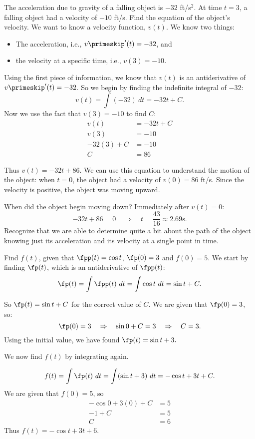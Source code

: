 \begin{example}\label{ex_anti4}
The acceleration due to gravity of a falling object is $-32$ ft/s$^2$. At time $t=3$, a falling object had a velocity of $-10$ ft/s. Find the equation of the object's velocity.
\solution
We want to know a velocity function, $v(t)$. We know two things:
	\begin{itemize}
		\item		The acceleration, i.e., $v\primeskip'(t)= -32$, and
		\item		the velocity at a specific time, i.e., $v(3) = -10$.
	\end{itemize}
Using the first piece of information, we know that $v(t)$ is an antiderivative of $v\primeskip'(t)=-32$. So we begin by finding the indefinite integral of $-32$:
\[v(t)=\int (-32)\ dt = -32t+C.\]
Now we use the fact that $v(3)=-10$ to find $C$:
\begin{align*}
	v(t) &= -32t+C \\
	v(3) &= -10 \\
	-32(3)+C &= -10\\
	C &= 86
\end{align*}

Thus $v(t)= -32t+86$. We can use this equation to understand the motion of the object: when $t=0$, the object had a velocity of $v(0) = 86$ ft/s. Since the velocity is positive, the object was moving upward.

When did the object begin moving down? Immediately after $v(t) = 0$:
\[-32t+86 = 0 \quad \Rightarrow\quad  t = \frac{43}{16}  \approx 2.69\text{s}.\]
Recognize that we are able to determine quite a bit about the path of the object knowing just its acceleration and its velocity at a single point in time.
\end{example}

\begin{example}\label{ex_anti5}
Find $f(t)$, given that $\fpp(t) = \cos t$, $\fp(0) = 3$ and $f(0) = 5$.
\solution
We start by finding $\fp(t)$, which is an antiderivative of $\fpp(t)$:
\[\fp(t)=\int \fpp(t)\ dt = \int \cos t\ dt = \sin t + C.\]

So $\fp(t) = \sin t+C$ for the correct value of $C$. We are given that $\fp(0) = 3$, so:
\[\fp(0) = 3 \quad \Rightarrow \quad \sin 0+C = 3 \quad \Rightarrow \quad C=3.\]
Using the initial value, we have found $\fp(t) = \sin t+ 3.$
		
We now find $f(t)$ by integrating again.

\[f(t)=\int \fp(t) \ dt = \int (\sin t+3)\ dt = -\cos t + 3t + C.\]
We are given that $f(0) = 5$, so
\begin{align*}
-\cos 0 + 3(0) + C &= 5 \\
-1 + C &= 5\\
C &= 6
\end{align*}
 Thus $f(t) = -\cos t + 3t + 6$.
\end{example}

